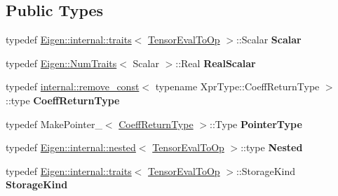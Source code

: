 \subsection*{Public Types}
\begin{DoxyCompactItemize}
\item 
\mbox{\label{class_eigen_1_1_tensor_eval_to_op_ae23381e5562d9ae2ff5c6ef56a6e0594}} 
typedef \hyperlink{struct_eigen_1_1internal_1_1traits}{Eigen\+::internal\+::traits}$<$ \hyperlink{class_eigen_1_1_tensor_eval_to_op}{Tensor\+Eval\+To\+Op} $>$\+::Scalar {\bfseries Scalar}
\item 
\mbox{\label{class_eigen_1_1_tensor_eval_to_op_a6ac1d179859bfd347528b1849a352a7c}} 
typedef \hyperlink{group___core___module_struct_eigen_1_1_num_traits}{Eigen\+::\+Num\+Traits}$<$ Scalar $>$\+::Real {\bfseries Real\+Scalar}
\item 
\mbox{\label{class_eigen_1_1_tensor_eval_to_op_a60130cd1135644b1dacf60f663b6b15a}} 
typedef \hyperlink{struct_eigen_1_1internal_1_1remove__const}{internal\+::remove\+\_\+const}$<$ typename Xpr\+Type\+::\+Coeff\+Return\+Type $>$\+::type {\bfseries Coeff\+Return\+Type}
\item 
\mbox{\label{class_eigen_1_1_tensor_eval_to_op_a3b269b528cfa6bca5424d51c7a591a1f}} 
typedef Make\+Pointer\+\_\+$<$ \hyperlink{group___sparse_core___module}{Coeff\+Return\+Type} $>$\+::Type {\bfseries Pointer\+Type}
\item 
\mbox{\label{class_eigen_1_1_tensor_eval_to_op_aceaa479fb7337589344bc6cee0401836}} 
typedef \hyperlink{struct_eigen_1_1internal_1_1nested}{Eigen\+::internal\+::nested}$<$ \hyperlink{class_eigen_1_1_tensor_eval_to_op}{Tensor\+Eval\+To\+Op} $>$\+::type {\bfseries Nested}
\item 
\mbox{\label{class_eigen_1_1_tensor_eval_to_op_a39cea47c21d4906be6a18fa6f2e47064}} 
typedef \hyperlink{struct_eigen_1_1internal_1_1traits}{Eigen\+::internal\+::traits}$<$ \hyperlink{class_eigen_1_1_tensor_eval_to_op}{Tensor\+Eval\+To\+Op} $>$\+::Storage\+Kind {\bfseries Storage\+Kind}
\item 

\end{DoxyCompactItemize}
